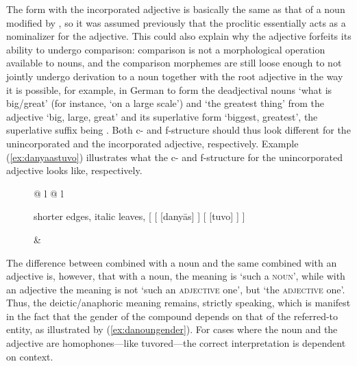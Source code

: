 The form with the incorporated adjective is basically the same as that of a
noun modified by , so it was assumed previously that the
proclitic essentially acts as a nominalizer for the adjective. This could also
explain why the adjective forfeits its ability to undergo comparison:
comparison is not a morphological operation available to nouns, and the
comparison morphemes are still loose enough to not jointly undergo derivation
to a noun together with the root adjective in the way it is possible, for
example, in German to form the deadjectival nouns  `what is
big/great' (for instance,  `on a large scale') and  `the greatest thing' from the adjective  `big, large, great'
and its superlative form  `biggest, greatest', the superlative
suffix being . Both c- and f-structure should thus look different
for the unincorporated and the incorporated adjective, respectively. Example
(\ref{ex:danyaastuvo}) illustrates what the c- and f-structure for the
unincorporated adjective looks like, respectively.

\begin{figure}[h]
\ex\label{ex:danyaastuvo} %
\begin{tabular}[t]{@{} l @{\quad} l}
\tl\quad\begin{forest} shorter edges, italic leaves,
[{}
		[\anno{\xhead{D}}
			[danyās]
		]
		[{\anno[\elem{\Adjc}]{AP}}
			[tuvo]
		]
]
\end{forest}

&

\tl\quad\label{ex:danyaastuvoavm} 

\end{tabular}
\xe
\end{figure}

The difference between  combined with a noun and the same
combined with an adjective is, however, that with a noun, the meaning is `such
a \textsc{noun}', while with an adjective the meaning is not `such an
\textsc{adjective} one', but `the \textsc{adjective} one'. Thus, the
deictic/anaphoric meaning remains, strictly speaking, which is manifest in the
fact that the gender of the compound depends on that of the referred-to entity,
as illustrated by (\ref{ex:danoungender}). For cases where the noun and the
adjective are homophones---like  {tuvo}{red}---the correct
interpretation is dependent on context.


